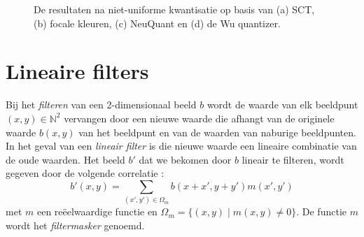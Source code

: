\begin{figure}[tbp]
\begin{center}
\caption{\label{fig:kwantistatie_uniform}De resultaten na niet-uniforme kwantisatie op basis van (a) SCT, (b) focale kleuren, (c) NeuQuant en (d) de Wu quantizer.}
\end{center}
\end{figure}

\section{Lineaire filters}

Bij het \emph{filteren} van een 2-dimensionaal beeld $b$ wordt de waarde van elk beeldpunt $(x,y) \in \mathbb{N}^2$ 
vervangen door een nieuwe waarde die afhangt van de originele waarde $b(x,y)$ van het beeldpunt en van de waarden 
van naburige beeldpunten. In het geval van een \emph{lineair filter} is die nieuwe waarde een lineaire combinatie 
van de oude waarden. Het beeld $b'$ dat we bekomen door $b$ lineair te filteren, wordt gegeven door
de volgende correlatie \cite{philips:beeldverwerking}:
$$
b'(x,y) = \sum_{(x',y') \in \Omega_m} b(x+x',y+y')m(x',y')
$$
met $m$ een re\"eelwaardige functie en $\Omega_m = \{ (x,y) \mid m(x,y) \ne 0 \}$. De functie $m$ wordt
het \emph{filtermasker} genoemd.

